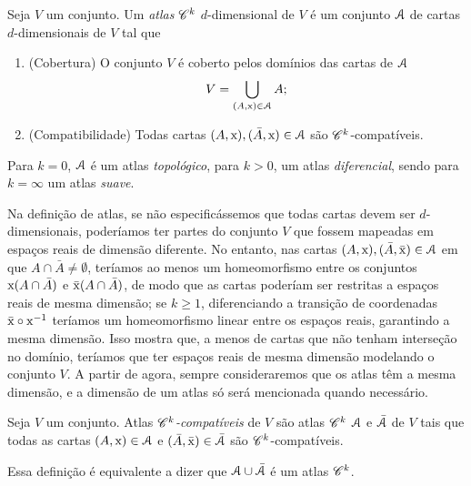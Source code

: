 \begin{defi}
Seja $V$ um conjunto. Um \emph{atlas} $\mathscr{C}^k$ $d$-dimensional de $V$ é um conjunto $\mathcal{A}$ de cartas $d$-dimensionais de $V$ tal que
	\begin{enumerate}
	\item (Cobertura) O conjunto $V$ é coberto pelos domínios das cartas de $\mathcal{A}$
	\begin{equation*}
	V = \displaystyle\bigcup_{(A,\mathrm{x}) \in \mathcal{A}} A;
	\end{equation*}
	\item (Compatibilidade) Todas cartas $(A,\mathrm{x}), (\bar A,\mathrm{x}) \in \mathcal{A}$  são $\mathscr{C}^k$-compatíveis.
	\end{enumerate}
Para $k=0$, $\mathcal{A}$ é um atlas \emph{topológico}, para $k>0$, um atlas \emph{diferencial}, sendo para $k=\infty$ um atlas \emph{suave}.
\end{defi}

Na definição de atlas, se não especificássemos que todas cartas devem ser $d$-dimensionais, poderíamos ter partes do conjunto $V$ que fossem mapeadas em espaços reais de dimensão diferente. No entanto, nas cartas $(A,\mathrm{x}), (\bar A,\bar {\mathrm{x}}) \in \mathcal{A}$ em que $A \cap \bar A \neq \emptyset$, teríamos ao menos um homeomorfismo entre os conjuntos $\mathrm{x}(A \cap \bar A)$ e $\bar{\mathrm{x}}(A \cap \bar A)$, de modo que as cartas poderíam ser restritas a espaços reais de mesma dimensão; se $k \geq 1$, diferenciando a transição de coordenadas $\bar{\mathrm{x}} \circ \mathrm{x}^{-1}$ teríamos um homeomorfismo linear entre os espaços reais, garantindo a mesma dimensão. Isso mostra que, a menos de cartas que não tenham interseção no domínio, teríamos que ter espaços reais de mesma dimensão modelando o conjunto $V$. A partir de agora, sempre consideraremos que os atlas têm a mesma dimensão, e a dimensão de um atlas só será mencionada quando necessário.

\begin{defi}
Seja $V$ um conjunto. Atlas \emph{$\mathscr{C}^k$-compatíveis} de $V$ são atlas $\mathscr{C}^k$ $\mathcal{A}$ e $\bar{\mathcal{A}}$ de $V$ tais que todas as cartas $(A,\mathrm{x}) \in \mathcal{A}$ e $(\bar A,\bar{\mathrm{x}}) \in \bar {\mathcal{A}}$ são $\mathscr{C}^k$-compatíveis.
\end{defi}

Essa definição é equivalente a dizer que $\mathcal{A} \cup \bar {\mathcal{A}}$ é um atlas $\mathscr{C}^k$.

